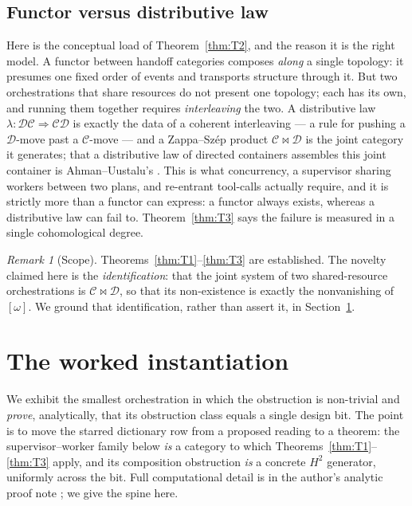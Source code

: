 \documentclass[11pt]{amsart}
\theoremstyle{definition}
\theoremstyle{remark}
\newtheorem{remark}[theorem]{Remark}
\newcommand{\C}{\mathcal{C}}
\newcommand{\D}{\mathcal{D}}
\begin{document}
\subsection*{Functor versus distributive law}
Here is the conceptual load of Theorem~\ref{thm:T2}, and the reason it is the right model. A
functor between handoff categories composes \emph{along} a single topology: it presumes one
fixed order of events and transports structure through it. But two orchestrations that share
resources do not present one topology; each has its own, and running them together requires
\emph{interleaving} the two. A distributive law $\lambda:\D\C\Rightarrow\C\D$ is exactly the
data of a coherent interleaving --- a rule for pushing a $\D$-move past a $\C$-move --- and a
Zappa--Sz\'ep product $\C\bowtie\D$ is the joint category it generates; that a distributive
law of directed containers assembles this joint container is Ahman--Uustalu's
\cite{AhmanUustaluDL}. This is what
concurrency, a supervisor sharing workers between two plans, and re-entrant tool-calls
actually require, and it is strictly more than a functor can express: a functor always exists,
whereas a distributive law can fail to. Theorem~\ref{thm:T3} says the failure is measured in a
single cohomological degree.

\begin{remark}[Scope]
Theorems~\ref{thm:T1}--\ref{thm:T3} are established. The novelty claimed here is the
\emph{identification}: that the joint system of two shared-resource orchestrations is
$\C\bowtie\D$, so that its non-existence is exactly the nonvanishing of $[\omega]$. We ground
that identification, rather than assert it, in Section~\ref{sec:worked}.
\end{remark}

\section{The worked instantiation}\label{sec:worked}

We exhibit the smallest orchestration in which the obstruction is non-trivial and \emph{prove},
analytically, that its obstruction class equals a single design bit. The point is to move the
starred dictionary row from a proposed reading to a theorem: the supervisor--worker family below
\emph{is} a category to which Theorems~\ref{thm:T1}--\ref{thm:T3} apply, and its composition
obstruction \emph{is} a concrete $H^2$ generator, uniformly across the bit. Full computational
detail is in the author's analytic proof note \cite{analytic}; we give the spine here.
\end{document}
